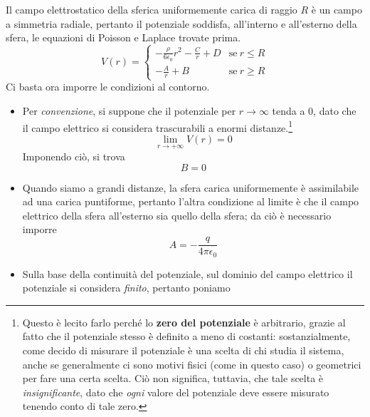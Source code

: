 \begin{examplewt}
	Il campo elettrostatico della sferica uniformemente carica di raggio $R$ è un campo a simmetria radiale, pertanto il potenziale soddisfa, all'interno e all'esterno della sfera, le equazioni di Poisson e Laplace trovate prima.
	\begin{equation}
		V(r)=
		\begin{cases}
			-\frac{\rho}{6\epsilon_0}r^2-\frac{C}{r}+D&\text{se}\ r\leq R\\
			-\frac{A}{r}+B&\text{se}\ r\geq R
		\end{cases}
	\end{equation}
	Ci basta ora imporre le condizioni al contorno.
	\begin{itemize}
		\item Per \textit{convenzione}, si suppone che il potenziale per $r\to\infty$ tenda a $0$, dato che il campo elettrico si considera trascurabili a enormi distanze.\footnote{Questo è lecito farlo perché lo \textbf{zero del potenziale} è arbitrario, grazie al fatto che il potenziale stesso è definito a meno di costanti: sostanzialmente, come decido di misurare il potenziale è una scelta di chi studia il sistema, anche se generalmente ci sono motivi fisici (come in questo caso) o geometrici per fare una certa scelta. Ciò non significa, tuttavia, che tale scelta è \textit{insignificante}, dato che \textit{ogni} valore del potenziale deve essere misurato tenendo conto di tale zero.}
		\begin{equation*}
			\lim_{r\to+\infty}V(r)=0
		\end{equation*}
		Imponendo ciò, si trova
		\begin{equation*}
			B=0
		\end{equation*}
		\item Quando siamo a grandi distanze, la sfera carica uniformemente è assimilabile ad una carica puntiforme, pertanto l'altra condizione al limite è che il campo elettrico della sfera all'esterno sia quello della sfera; da ciò è necessario imporre 
		\begin{equation*}
			A=-\frac{q}{4\pi\epsilon_0}
		\end{equation*}
	\end{itemize}
	\begin{itemize}%
		\item Sulla base della continuità del potenziale, sul dominio del campo elettrico il potenziale si considera \textit{finito}, pertanto poniamo

\end{itemize}
\end{examplewt}
